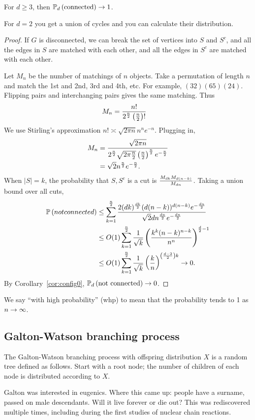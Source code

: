 \begin{thm}
For $d\ge 3$, then $\mathbb{P}_d\left( \text{connected} \right)\to 1$.
\end{thm}
For $d=2$ you get a union of cycles and you can calculate their distribution.
\begin{proof}
If $G$ is disconnected, we can break the set of vertices into $S$ and $S^c$, and all the edges in $S$ are matched with each other, and all the edges in $S^c$ are matched with each other.

Let $M_n$ be the number of matchings of $n$ objects.
Take a permutation of length $n$ and match the 1st and 2nd, 3rd and 4th, etc. For example, $(32)(65)(24)$. 
Flipping pairs and interchanging pairs gives the same matching. Thus
\begin{align}
M_n &= \frac{n!}{2^{\frac{n}{2}} \left( {\frac{n}{2}} \right)!}
\end{align}
We use Stirling's approximation $n!\asymp \sqrt{2\pi n}n^n e^{-n}$. Plugging in, 
\begin{align}
M_n &= \frac{\sqrt{2\pi n}}{2^{\frac{n}{2}}\sqrt{2\pi \frac{n}{2}}\left( {\frac{n}{2}} \right)^{\frac{n}{2}} e^{-\frac{n}{2}}}\\
&= \sqrt 2 n^{\frac{n}{2}} e^{-\frac{n}{2}}.
\end{align}
When $|S|=k$, the probability that $S,S^c$ is a cut is $\frac{M_{dk}M_{d(n-k)}}{M_{dn}}$. 
Taking a union bound over all cuts,
\begin{align}
\mathbb{P}\left( {not connected} \right)
&\le \sum_{k=1}^{\frac{n}{2}} \frac{2(dk)^{\frac{dk}{2}} (d(n-k))^{d(n-k)}e^{-\frac{dn}{2}}}{\sqrt 2 dn^{\frac{dn}{2}}e^{-\frac{dn}{2}}}\\
&\le O(1) \sum_{k=1}^{\frac{n}{2}}\frac{1}{\sqrt k}\left( {\frac{k^k (n-k)^{n-k}}{n^n}} \right)^{\frac{d}{2}-1}\\
&\le O(1) \sum_{k=1}^{\frac{n}{2}} \frac{1}{\sqrt k} \left( {\frac{k}{n}} \right)^{\left( {\frac{d-2}{2}} \right) k}\to 0.
\end{align}
By Corollary~\ref{cor:config0}, $\mathbb{P}_d\left( \text{not connected} \right)\to 0$. 
\end{proof}
We say ``with high probability'' (whp) to mean that the probability tends to 1 as $n\to \infty$.

\subsection{Galton-Watson branching process}

\begin{df}
The Galton-Watson branching process with offspring distribution $X$ is a random tree defined as follows. Start with a root node; the number of children of each node is distributed according to $X$.
\end{df}
Galton was interested in eugenics. Where this came up: people have a surname, passed on male descendants. Will it live forever or die out? This was rediscovered multiple times, including during the first studies of nuclear chain reactions.

